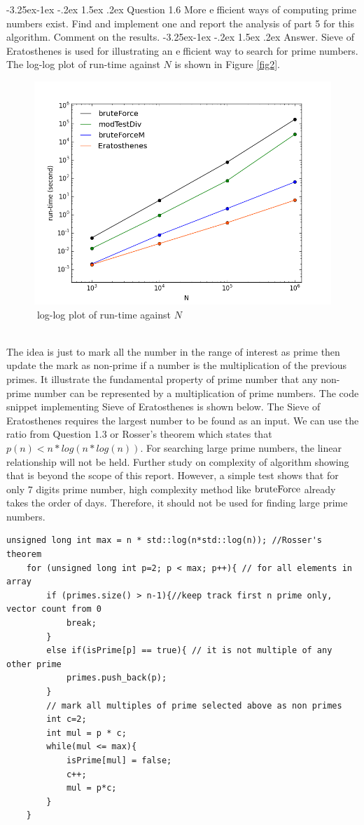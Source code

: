 \documentclass[a4paper,12pt]{article}%
\makeatletter
\renewcommand\subsection{\@startsection{subsection}{2}{\z@}%
                                     {-3.25ex\@plus -1ex \@minus -.2ex}%
                                     {1.5ex \@plus .2ex}%
                                     {\normalfont\bfseries}}
\renewcommand\subsubsection{\@startsection{subsection}{2}{\z@}%
                                     {-3.25ex\@plus -1ex \@minus -.2ex}%
                                     {1.5ex \@plus .2ex}%
                                     {\normalfont\bfseries\itshape}}%
\makeatother
\begin{document}
\subsection{Question 1.6}
More efficient ways of computing prime numbers exist. Find and implement one and report
the analysis of part 5 for this algorithm. Comment on the results.
\subsubsection{Answer.}
Sieve of Eratosthenes is used for illustrating an efficient way to search for prime numbers.
The log-log plot of run-time against $N$ is shown in Figure \eqref{fig2}.
\begin{figure}[h!]
\centering
\includegraphics[width=0.8\linewidth, height=0.5\linewidth]{rt-vs-n-eratos.png}
\caption{log-log plot of run-time against $N$}
\label{fig2}
\end{figure}\\
The idea is just to mark all the number in the range of interest as prime then update the mark as non-prime if a number is the multiplication of the previous primes. It illustrate the fundamental property of prime number that any non-prime number can be represented by a multiplication of prime numbers. The code snippet implementing Sieve of Eratosthenes is shown below. The Sieve of Eratosthenes requires the largest number to be found as an input. We can use the ratio from Question 1.3 or Rosser's theorem which states that $p(n) < n * log(n*log(n))$. For searching large prime numbers, the linear relationship will not be held. Further study on complexity of algorithm showing that is beyond the scope of this report. However, a simple test shows that for only 7 digits prime number, high complexity method like $\lstinline{bruteForce}$ already takes the order of days. Therefore, it should not be used for finding large prime numbers. 
\begin{lstlisting}[title = $\lstinline{Eratosthenes}$]
	unsigned long int max = n * std::log(n*std::log(n)); //Rosser's theorem
    for (unsigned long int p=2; p < max; p++){ // for all elements in array
        if (primes.size() > n-1){//keep track first n prime only, vector count from 0
            break;
        }
        else if(isPrime[p] == true){ // it is not multiple of any other prime
            primes.push_back(p);
        }
        // mark all multiples of prime selected above as non primes
        int c=2;
        int mul = p * c;
        while(mul <= max){
            isPrime[mul] = false;
            c++;
            mul = p*c;
        }        
    }
\end{lstlisting}
\end{document}
